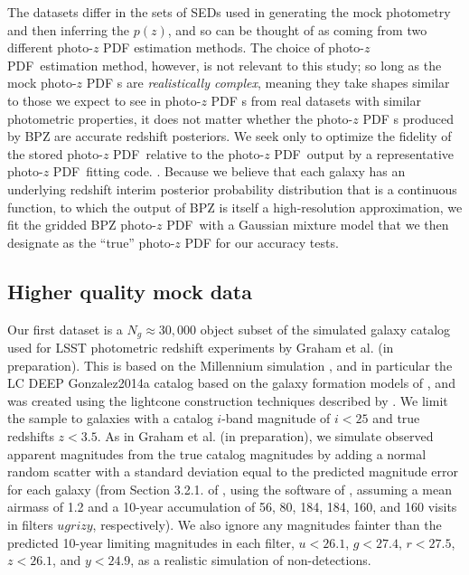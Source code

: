 \documentclass[\docopts]{\docclass}
\newcommand{\pz}{photo-$z$ PDF\xspace}
\begin{document}
The datasets differ in the sets of SEDs used in generating the mock photometry and then inferring the $p(z)$, and so can be thought of as coming from two different \pz estimation methods.
The choice of \pz\ estimation method, however,
is not relevant to this study; so long as the mock \pz s are
\textit{realistically complex}, meaning they take shapes similar to those we expect
to see in \pz s from real datasets with similar photometric properties, it does
not matter whether the \pz s produced by BPZ are accurate redshift posteriors.
We seek only to optimize the fidelity of the stored \pz\ relative to the \pz\
output by a representative \pz\ fitting code.  \citep[See][and Schmidt et al. in preparation for other work
comparing the accuracy of \pz s produced by different methods.]{tanaka_photometric_2017}.
Because we believe that each galaxy has an underlying redshift
interim posterior probability distribution that is a continuous function, to
which the output of BPZ is itself a high-resolution approximation, we fit the
gridded BPZ \pz\ with a Gaussian mixture model that we then designate as the ``true'' \pz for our accuracy tests.


\subsection{Higher quality mock data}
\label{sec:graham}

Our first dataset is a $N_{g}\approx30,000$ object subset of the simulated galaxy
catalog used for LSST photometric redshift experiments by Graham et al. (in
preparation). This is based on the Millennium simulation
\citep{springel_simulations_2005}, and in particular the LC DEEP Gonzalez2014a
catalog based on the galaxy formation models of \cite{gonzalez-perez_how_2014},
and was created using the lightcone construction techniques described by
\cite{merson_lightcone_2013}.  We limit the sample to galaxies with a catalog
$i$-band magnitude of $i<25$ and true redshifts $z<3.5$. As in Graham et al.
(in preparation), we simulate observed apparent magnitudes from the true catalog
magnitudes by adding a normal random scatter with a standard deviation equal to
the predicted magnitude error for each galaxy (from Section 3.2.1. of
\citealt{ivezic_lsst:_2008}, using the software of
\citealt{connolly_end--end_2014}, assuming a mean airmass of 1.2 and a 10-year
accumulation of 56, 80, 184, 184, 160, and 160 visits in filters $ugrizy$,
respectively).  We also ignore any magnitudes fainter than the predicted
10-year limiting magnitudes in each filter, $u<26.1$, $g<27.4$, $r<27.5$,
$z<26.1$, and $y<24.9$, as a realistic simulation of non-detections.
\end{document}
